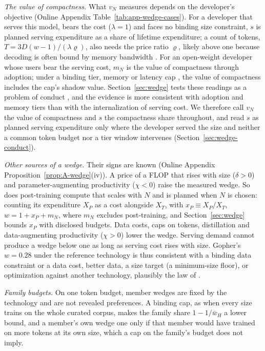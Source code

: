 \textit{The value of compactness.} What $v_N$ measures depends on the developer's objective (Online Appendix
Table~\ref{tab:app-wedge-cases}). For a developer that serves this model, bears the cost ($\lambda=1$) and faces no
binding size constraint, $s$ is planned serving expenditure as a share of lifetime expenditure; a count of tokens,
$T=3D(w-1)/(\lambda\varrho)$, also needs the price ratio $\varrho$, likely above one because decoding is often bound by
memory bandwidth \citep{erdil2025inference}. For an open-weight developer whose users bear
the serving cost, $m_N$ is the value of compactness through adoption; under a binding tier, memory or latency cap
\citep{bian2025scaling}, the value of compactness includes the cap's shadow value. Section~\ref{sec:wedge} tests these
readings as a problem of conduct \citep{berry2014identification,backus2021common,duarte2024testing}, and the evidence is
more consistent with adoption and memory tiers than with the internalization of serving cost. We therefore call $v_N$
the value of compactness and $s$ the compactness share throughout, and read $s$ as planned serving expenditure only
where the developer served the size and neither a common token budget nor a tier window intervenes
(Section~\ref{sec:wedge-conduct}).

\textit{Other sources of a wedge.} Their signs are known (Online Appendix Proposition~\ref{prop:A-wedge}(iv)). A price
of a FLOP that rises with size ($\delta>0$) and parameter-augmenting productivity ($\chi<0$) raise the measured wedge.
So does post-training compute that scales with $N$ and is planned when $N$ is chosen: counting its expenditure $X_P$ as a
cost alongside $X_T$, with $x_P\equiv X_P/X_T$, $w=1+x_P+m_N$, where $m_N$ excludes post-training, and
Section~\ref{sec:wedge} bounds $x_P$ with disclosed budgets. Data costs, caps on tokens, distillation
\citep{busbridge2025distillation} and data-augmenting productivity ($\chi>0$) lower the wedge. Serving demand cannot
produce a wedge below one as long as serving cost rises with size. Gopher's $w=0.28$ under the reference technology
\citep{rae2021scaling} is thus consistent with a binding data constraint or a data cost, better data, a size target (a
minimum-size floor), or optimization against another technology, plausibly the law of \citet{kaplan2020scaling}.

\textit{Family budgets.} On one token budget, member wedges are fixed by the technology and are not revealed
preferences. A binding cap, as when every size trains on the whole curated corpus, makes the family share $1-1/\bar w_H$ a lower bound,
and a member's own wedge one only if that member would have trained on more tokens at its own size, which a cap on the
family's budget does not imply.

